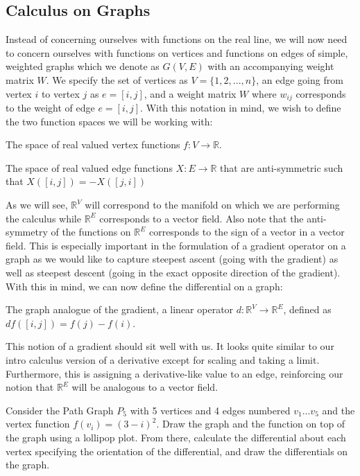\subsection{Calculus on Graphs}
Instead of concerning ourselves with functions on the real line, we
will now need to concern ourselves with functions on vertices and
functions on edges of simple, weighted graphs which we denote as
\(G(V,E)\) with an accompanying weight matrix \(W\). We specify the
set of vertices as \(V = \{1, 2, ... , n\}\), an edge going from
vertex \(i\) to vertex \(j\) as \(e = [i,j]\), and a weight matrix
\(W\) where \(w_{ij}\) corresponds to the weight of edge \(e =
      [i,j]\). With this notation in mind, we wish to define the two
      function spaces we will be working with: 
\begin{definition}
The space of real valued vertex functions \(f: V \rightarrow \mathbb{R}\).
\end{definition}
\begin{definition}
The space of real valued edge functions \(X: E \rightarrow
\mathbb{R}\) that are anti-symmetric such that \(X([i,j]) =
-X([j,i])\) 
\end{definition}
As we will see, \(\mathbb{R}^V\) will correspond to the manifold on
which we are performing the calculus while \(\mathbb{R}^E\)
corresponds to a vector field. Also note that the anti-symmetry of the
functions on \(\mathbb{R}^E\) corresponds to the sign of a vector in a
vector field. This is especially important in the formulation of a
gradient operator on a graph as we would like to capture steepest
ascent (going with the gradient) as well as steepest descent (going in
the exact opposite direction of the gradient). With this in mind, we
can now define the differential on a graph: 
\begin{definition}
The graph analogue of the gradient, a linear operator \(d:
\mathbb{R}^V \rightarrow \mathbb{R}^E\), defined as \(df([i, j]) =
f(j) - f(i)\). 
\end{definition}
This notion of a gradient should sit well with us. It looks quite
similar to our intro calculus version of a derivative except for
scaling and taking a limit. Furthermore, this is assigning a
derivative-like value to an edge, reinforcing our notion that
\(\mathbb{R}^E\) will be analogous to a vector field. 
\begin{exercise}
Consider the Path Graph \(P_5\) with 5 vertices and 4 edges numbered
\(v_1...v_5\) and the vertex function \(f(v_i) = (3 - i)^2\). Draw the
graph and the function on top of the graph using a lollipop plot. From
there, calculate the differential about each vertex specifying the
orientation of the differential, and draw the differentials on the
graph. 
\end{exercise}
